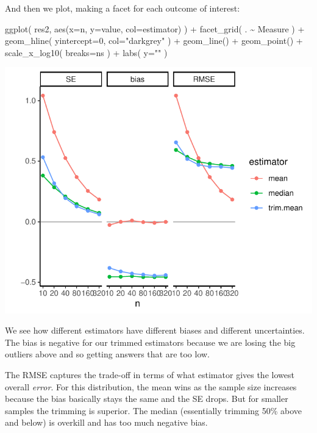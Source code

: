 \documentclass[
]{book}
\newenvironment{Shaded}{\begin{snugshade}}{\end{snugshade}}
\newcommand{\AttributeTok}[1]{\textcolor[rgb]{0.77,0.63,0.00}{#1}}
\newcommand{\DecValTok}[1]{\textcolor[rgb]{0.00,0.00,0.81}{#1}}
\newcommand{\FunctionTok}[1]{\textcolor[rgb]{0.00,0.00,0.00}{#1}}
\newcommand{\NormalTok}[1]{#1}
\newcommand{\SpecialCharTok}[1]{\textcolor[rgb]{0.00,0.00,0.00}{#1}}
\newcommand{\StringTok}[1]{\textcolor[rgb]{0.31,0.60,0.02}{#1}}
\begin{document}
And then we plot, making a facet for each outcome of interest:

\begin{Shaded}
\begin{Highlighting}[]
\FunctionTok{ggplot}\NormalTok{( res2, }\FunctionTok{aes}\NormalTok{(}\AttributeTok{x=}\NormalTok{n, }\AttributeTok{y=}\NormalTok{value, }\AttributeTok{col=}\NormalTok{estimator) ) }\SpecialCharTok{+}
    \FunctionTok{facet\_grid}\NormalTok{( . }\SpecialCharTok{\textasciitilde{}}\NormalTok{ Measure ) }\SpecialCharTok{+}
    \FunctionTok{geom\_hline}\NormalTok{( }\AttributeTok{yintercept=}\DecValTok{0}\NormalTok{, }\AttributeTok{col=}\StringTok{"darkgrey"}\NormalTok{ ) }\SpecialCharTok{+}
    \FunctionTok{geom\_line}\NormalTok{() }\SpecialCharTok{+} \FunctionTok{geom\_point}\NormalTok{() }\SpecialCharTok{+}
    \FunctionTok{scale\_x\_log10}\NormalTok{( }\AttributeTok{breaks=}\NormalTok{ns ) }\SpecialCharTok{+}
    \FunctionTok{labs}\NormalTok{( }\AttributeTok{y=}\StringTok{""}\NormalTok{ )}
\end{Highlighting}
\end{Shaded}

\begin{center}\includegraphics[width=0.75\linewidth]{Designing-Simulations-in-R_files/figure-latex/unnamed-chunk-178-1} \end{center}

We see how different estimators have different biases and different
uncertainties. The bias is negative for our trimmed estimators because we
are losing the big outliers above and so getting answers that are too low.

The RMSE captures the trade-off in terms of what estimator gives the lowest
overall \emph{error}. For this distribution, the mean wins as the sample size
increases because the bias basically stays the same and the SE drops. But
for smaller samples the trimming is superior. The median (essentially
trimming 50\% above and below) is overkill and has too much negative bias.
\end{document}
